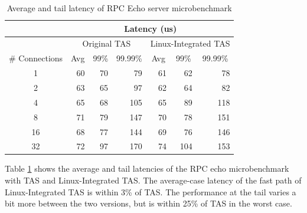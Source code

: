 \begin{table}
\begin{tabular}{@{}crrrrrr@{}}
\toprule
               & \multicolumn{6}{c}{Latency (us)}                                                                                                                                    \\ \midrule
               & \multicolumn{3}{c}{Original TAS}                                                          & \multicolumn{3}{c}{Linux-Integrated TAS}                                         \\
\# Connections & \multicolumn{1}{c}{Avg} & \multicolumn{1}{c}{99\%} & \multicolumn{1}{c}{99.99\%} & \multicolumn{1}{c}{Avg} & \multicolumn{1}{c}{99\%} & \multicolumn{1}{c}{99.99\%} \\
1              & 60                      & 70                       & 79                          & 61                      & 62                       & 78                          \\
2              & 63                      & 65                       & 97                          & 62                      & 64                       & 82                          \\
4              & 65                      & 68                       & 105                         & 65                      & 89                       & 118                         \\
8              & 71                      & 79                       & 147                         & 70                      & 78                       & 151                         \\
16             & 68                      & 77                       & 144                         & 69                      & 76                       & 146                         \\
32             & 72                      & 97                       & 170                         & 74                      & 104                      & 153                         \\ \bottomrule
\end{tabular}
\vspace{16pt}
\caption{Average and tail latency of RPC Echo server microbenchmark}
\label{tab:fastpath-latency}

\end{table}

Table \ref{tab:fastpath-latency} shows the average and tail latencies of the RPC 
echo microbenchmark with TAS and Linux-Integrated TAS. The average-case latency
of the fast path of Linux-Integrated TAS is within 3\% of TAS. The performance 
at the tail varies a bit more between the two versions, but is within 25\% of 
TAS in the worst case.

